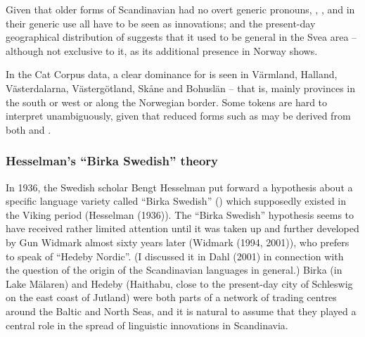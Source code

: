Given that older forms of Scandinavian had no overt generic pronouns, , , and  in their generic use all have to be seen as innovations; and the present-day geographical distribution of  suggests that it used to be general in the Svea area – although not exclusive to it, as its additional presence in Norway shows. 

In the Cat Corpus data, a clear dominance for is seen in Värmland, Halland, Västerdalarna, Västergötland, Skåne and Bohuslän – that is, mainly provinces in the south or west or along the Norwegian border. Some tokens are hard to interpret unambiguously, given that reduced forms such as  may be derived from both  and . 

\subsubsection[Hesselman’s “Birka Swedish” theory]{\rmfamily Hesselman’s “Birka Swedish” theory}
\label{bkm:Ref134938069}%
In 1936, the Swedish scholar Bengt Hesselman put forward a hypothesis about a specific language variety called “Birka Swedish” () which supposedly existed in the Viking period (Hesselman (1936)). The “Birka Swedish” hypothesis seems to have received rather limited attention until it was taken up and further developed by Gun Widmark almost sixty years later (Widmark (1994, 2001)), who prefers to speak of “Hedeby Nordic”. (I discussed it in Dahl (2001) in connection with the question of the origin of the Scandinavian languages in general.) Birka (in Lake Mälaren) and Hedeby (Haithabu, close to the present-day city of Schleswig on the east coast of Jutland) were both parts of a network of trading centres around the Baltic and North Seas, and it is natural to assume that they played a central role in the spread of linguistic innovations in Scandinavia. 

